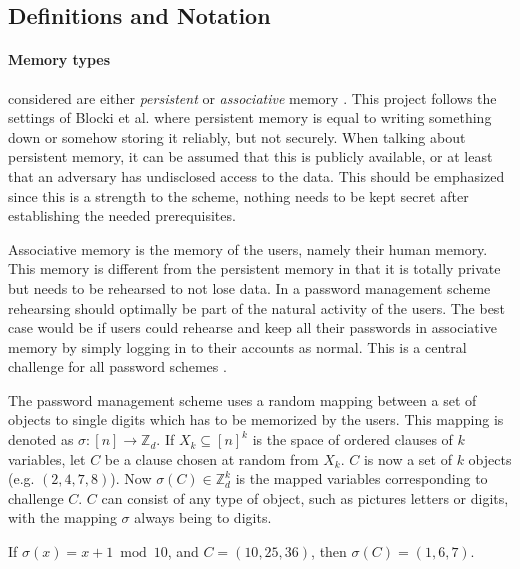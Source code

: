 \subsection{Definitions and Notation}
\paragraph{Memory types} considered are either \emph{persistent} or \emph{associative} memory \cite{human-memory}. This project follows the settings of Blocki et al. \cite{naturally-rehearsing, hcp-blocki} where persistent memory is equal to writing something down or somehow storing it reliably, but not securely. When talking about persistent memory, it can be assumed that this is publicly available, or at least that an adversary has undisclosed access to the data. This should be emphasized since this is a strength to the scheme, nothing needs to be kept secret after establishing the needed prerequisites. 
    \par Associative memory is the memory of the users, namely their human memory. This memory is different from the persistent memory in that it is totally private but needs to be rehearsed to not lose data. In a password management scheme rehearsing should optimally be part of the natural activity of the users. The best case would be if users could rehearse and keep all their passwords in associative memory by simply logging in to their accounts as normal. This is a central challenge for all password schemes \cite{naturally-rehearsing}.

The password management scheme uses a random mapping between a set of objects to single digits which has to be memorized by the users. This mapping is denoted as $\sigma : [n] \rightarrow \mathbb{Z}_d$. If $X_k \subseteq [n]^k$ is the space of ordered clauses of $k$ variables, let $C$ be a clause chosen at random from $X_k$. $C$ is now a set of $k$ objects (e.g. $(2,4,7,8)$). Now $\sigma (C) \in \mathbb{Z}_d^k$ is the mapped variables corresponding to challenge $C$. $C$ can consist of any type of object, such as pictures letters or digits, with the mapping $\sigma$ always being to digits.

\begin{example}
    If $\sigma(x) = x+1  \bmod 10$, and $C = (10,25,36)$, then $\sigma(C) = (1,6,7)$.
\end{example}


